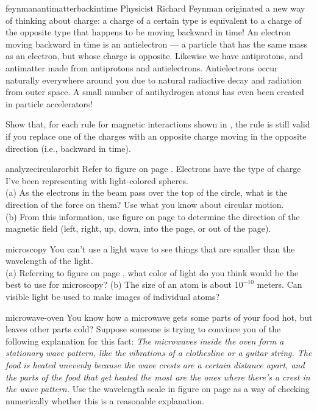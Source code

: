 \begin{hwsection}
\begin{hw}{feynmanantimatterbackintime}
Physicist Richard Feynman originated a new way of thinking about charge: a charge of a certain
type is equivalent to a charge of the opposite type that happens to be moving backward
in time! An electron moving backward in time is an antielectron --- a particle that has the same
mass as an electron, but whose charge is opposite. Likewise we have antiprotons, and antimatter
made from antiprotons and antielectrons. Antielectrons occur naturally everywhere around you due to
natural radiactive decay and radiation from outer space. A small number of antihydrogen atoms has even
been created in particle accelerators!

Show that, for each rule for magnetic interactions shown in , the rule is
still valid if you replace one of the charges with an opposite charge moving in the 
opposite direction (i.e., backward in time).
\end{hw}

\begin{hw}{analyzecircularorbit}
Refer to figure  on page  \pageref{fig:circularorbit}. Electrons have the
type of charge I've been representing with light-colored spheres.\\
(a) As the electrons in the beam pass over the top of the circle,
what is the direction of the force on them? Use what you know about circular motion.\\
(b) From this information, use figure 
on page \pageref{fig:righthandrule} to determine the direction of the magnetic field
(left, right, up, down, into the page, or out of the page).
\end{hw}

\begin{hw}{microscopy}
You can't use a light wave to see things that are smaller than the wavelength of the light.\\
(a) Referring to figure  on
page \pageref{fig:emspectrum}, what color of light do you think would be the best to use
for microscopy?\hwendpart
(b) The size of an atom is about $10^{-10}$ meters. Can visible light be used to make images
of individual atoms?
\end{hw}

\begin{hw}{microwave-oven}
You know how a microwave gets some parts of your food hot, but leaves other parts cold?
Suppose someone is trying to convince you of the following explanation for this fact:
\emph{The microwaves inside the oven form a stationary wave pattern, like the vibrations
of a clothesline or a guitar string. The food is heated unevenly because
the wave crests are a certain
distance apart, and the parts of the food that get heated the most are the ones where there's
a crest in the wave pattern.} Use the wavelength scale in figure  on
page \pageref{fig:emspectrum} as a way of checking numerically
whether this is a reasonable explanation.
\end{hw}


\end{hwsection}
